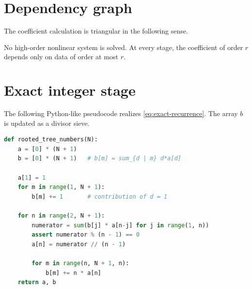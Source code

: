 \documentclass[11pt,a4paper,oneside,openany]{book}
\theoremstyle{definition}
\theoremstyle{remark}
\begin{document}
\section{Dependency graph}
The coefficient calculation is triangular in the following sense.
\begin{center}
\end{center}
No high-order nonlinear system is solved.  At every stage, the coefficient of
order $r$ depends only on data of order at most $r$.

\section{Exact integer stage}
The following Python-like pseudocode realizes
\cref{eq:exact-recurrence}.  The array $b$ is updated as a divisor sieve.

\begin{lstlisting}[language=Python,caption={Exact generation of A000081.}]
def rooted_tree_numbers(N):
    a = [0] * (N + 1)
    b = [0] * (N + 1)   # b[m] = sum_{d | m} d*a[d]

    a[1] = 1
    for m in range(1, N + 1):
        b[m] += 1       # contribution of d = 1

    for n in range(2, N + 1):
        numerator = sum(b[j] * a[n-j] for j in range(1, n))
        assert numerator % (n - 1) == 0
        a[n] = numerator // (n - 1)

        for m in range(n, N + 1, n):
            b[m] += n * a[n]
    return a, b
\end{lstlisting}
\end{document}
